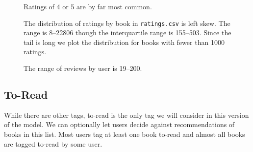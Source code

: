 \documentclass[11pt]{article}
\begin{document}
\begin{figure}
    \begin{center}
    \end{center}
    \caption[Distribution of User Ratings]{Ratings of 4 or 5 are by far most common.}
     \label{fig:average-rating-reviews-count}
\end{figure}
    

\begin{figure}
    \begin{center}
    \end{center}
    \caption[Distribution of Ratings by Book]{The distribution of ratings by book in \texttt{ratings.csv} is left
skew. The range is 8--22806 though the interquartile range is 155--503. Since the tail is long we plot the distribution for books with fewer
than 1000 ratings.}
     \label{fig:ratings-by-book}
\end{figure}


\begin{figure}
    \begin{center}
    \end{center}
    \caption[Distribution of Ratings by User]{The range of reviews by user is 19--200.}
     \label{fig:ratings-by-user}
\end{figure}

    
    \hypertarget{to-read}{%
\subsection{To-Read}\label{to-read}}

While there are other tags, to-read is the only tag we will consider in this version of the model. We
can optionally let users decide against recommendations of books in this
list. Most users tag at least one book to-read and almost all books are
tagged to-read by some user.





    
    
    
    
\end{document}
